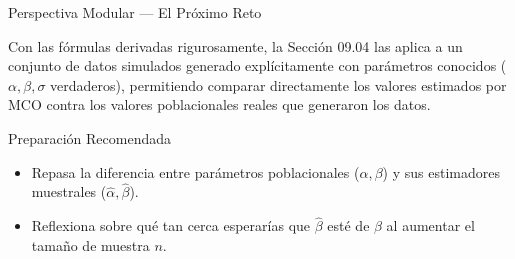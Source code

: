 \documentclass[10pt, aspectratio=169]{beamer}
\begin{document}
\begin{frame}{Perspectiva Modular --- El Próximo Reto}
  \scriptsize
  \begin{retoclase}
    Con las fórmulas derivadas rigurosamente, la Sección 09.04 las aplica a un conjunto de datos simulados generado explícitamente con parámetros conocidos ($\alpha,\beta,\sigma$ verdaderos), permitiendo comparar directamente los valores estimados por MCO contra los valores poblacionales reales que generaron los datos.
  \end{retoclase}

  \vspace{0.08cm}
  \pause
  \begin{alertblock}{Preparación Recomendada}
    \begin{itemize}\itemsep=0.06cm
      \item Repasa la diferencia entre parámetros poblacionales ($\alpha,\beta$) y sus estimadores muestrales ($\hat\alpha,\hat\beta$).
      \item Reflexiona sobre qué tan cerca esperarías que $\hat\beta$ esté de $\beta$ al aumentar el tamaño de muestra $n$.
    \end{itemize}
  \end{alertblock}
\end{frame}
\end{document}
